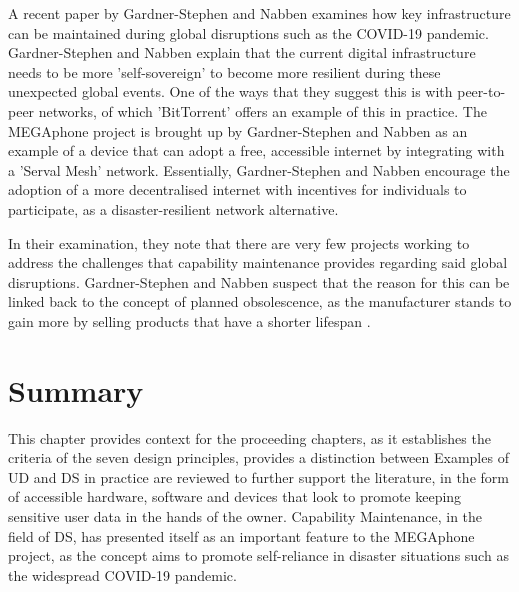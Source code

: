 A recent paper by Gardner-Stephen and Nabben \cite{capability} examines how key infrastructure can be maintained during global disruptions such as the COVID-19 pandemic.
Gardner-Stephen and Nabben explain that the current digital infrastructure needs to be more 'self-sovereign' to become more resilient during these unexpected global events.
One of the ways that they suggest this is with peer-to-peer networks, of which 'BitTorrent' offers an example of this in practice.
The MEGAphone project is brought up by Gardner-Stephen and Nabben as an example of a device that can adopt a free, accessible internet by integrating with a 'Serval Mesh' \cite{serval} network.
Essentially, Gardner-Stephen and Nabben encourage the adoption of a more decentralised internet with incentives for individuals to participate, as a disaster-resilient network alternative.

In their examination, they note that there are very few projects working to address the challenges that capability maintenance provides regarding said global disruptions.
Gardner-Stephen and Nabben suspect that the reason for this can be linked back to the concept of planned obsolescence, as the manufacturer stands to gain more by selling products that have a shorter lifespan \cite{obsolescence2}.


\section{Summary}
This chapter provides context for the proceeding chapters, as it establishes the criteria of the seven design principles, provides a distinction between 
Examples of UD and DS in practice are reviewed to further support the literature, in the form of accessible hardware, software and devices that look to promote keeping sensitive user data in the hands of the owner.
Capability Maintenance, in the field of DS, has presented itself as an important feature to the MEGAphone project, as the concept aims to promote self-reliance in disaster situations such as the widespread COVID-19 pandemic.
